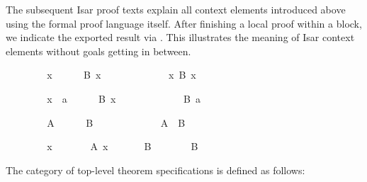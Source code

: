 \begin{isabellebody}
\begin{isamarkuptext}
  \medskip The subsequent Isar proof texts explain all context
  elements introduced above using the formal proof language itself.
  After finishing a local proof within a block, we indicate the
  exported result via \hyperlink{command.note}{\mbox{}}.  This illustrates the meaning
  of Isar context elements without goals getting in between.%
\end{isamarkuptext}%
\isamarkuptrue%
%
\isadelimproof
%
\endisadelimproof
%
\isatagproof
%
\begin{minipage}{0.22\textwidth}
\ \ \isacommand{{\isacharbraceleft}}\isamarkupfalse%
\isanewline
\ \ \ \ \isamarkupfalse%
\ x\isanewline
\ \ \ \ \isamarkupfalse%
\ {\isachardoublequoteopen}B\ x{\isachardoublequoteclose}\isanewline
\ \ \ \ \ \ \isamarkupfalse%
\isanewline
\ \ \isacommand{{\isacharbraceright}}\isamarkupfalse%
\isanewline
\ \ \isamarkupfalse%
\ {\isacharbackquoteopen}{\isasymAnd}x{\isachardot}\ B\ x{\isacharbackquoteclose}%
\end{minipage}\quad\begin{minipage}{0.22\textwidth}
\ \ \isacommand{{\isacharbraceleft}}\isamarkupfalse%
\isanewline
\ \ \ \ \isamarkupfalse%
\ x\ {\isasymequiv}\ a\isanewline
\ \ \ \ \isamarkupfalse%
\ {\isachardoublequoteopen}B\ x{\isachardoublequoteclose}\isanewline
\ \ \ \ \ \ \isamarkupfalse%
\isanewline
\ \ \isacommand{{\isacharbraceright}}\isamarkupfalse%
\isanewline
\ \ \isamarkupfalse%
\ {\isacharbackquoteopen}B\ a{\isacharbackquoteclose}%
\end{minipage}\quad\begin{minipage}{0.22\textwidth}
\ \ \isacommand{{\isacharbraceleft}}\isamarkupfalse%
\isanewline
\ \ \ \ \isamarkupfalse%
\ A\isanewline
\ \ \ \ \isamarkupfalse%
\ B\isanewline
\ \ \ \ \ \ \isamarkupfalse%
\isanewline
\ \ \isacommand{{\isacharbraceright}}\isamarkupfalse%
\isanewline
\ \ \isamarkupfalse%
\ {\isacharbackquoteopen}A\ {\isasymLongrightarrow}\ B{\isacharbackquoteclose}%
\end{minipage}\quad\begin{minipage}{0.34\textwidth}
\ \ \isacommand{{\isacharbraceleft}}\isamarkupfalse%
\isanewline
\ \ \ \ \isamarkupfalse%
\ x\isanewline
\ \ \ \ \ \ \ {\isachardoublequoteopen}A\ x{\isachardoublequoteclose}\ \isamarkupfalse%
\isanewline
\ \ \ \ \isamarkupfalse%
\ B\ \isamarkupfalse%
\isanewline
\ \ \isacommand{{\isacharbraceright}}\isamarkupfalse%
\isanewline
\ \ \isamarkupfalse%
\ {\isacharbackquoteopen}B{\isacharbackquoteclose}%
\end{minipage}
%
\endisatagproof
{\isafoldproof}%
%
\isadelimproof
%
\endisadelimproof
%
\isamarkuptrue%
%
\begin{isamarkuptext}%
The category  of top-level theorem specifications
  is defined as follows:


\end{isamarkuptext}
\end{isabellebody}
